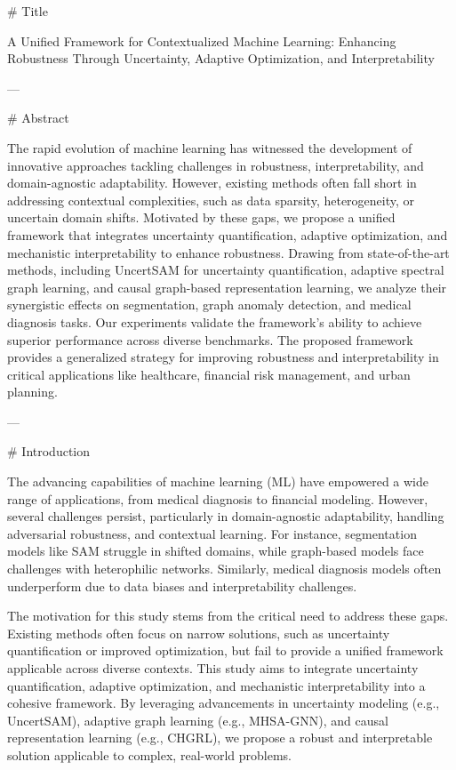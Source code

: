 # Title

A Unified Framework for Contextualized Machine Learning: Enhancing Robustness Through Uncertainty, Adaptive Optimization, and Interpretability

---

# Abstract

The rapid evolution of machine learning has witnessed the development of innovative approaches tackling challenges in robustness, interpretability, and domain-agnostic adaptability. However, existing methods often fall short in addressing contextual complexities, such as data sparsity, heterogeneity, or uncertain domain shifts. Motivated by these gaps, we propose a unified framework that integrates uncertainty quantification, adaptive optimization, and mechanistic interpretability to enhance robustness. Drawing from state-of-the-art methods, including UncertSAM for uncertainty quantification, adaptive spectral graph learning, and causal graph-based representation learning, we analyze their synergistic effects on segmentation, graph anomaly detection, and medical diagnosis tasks. Our experiments validate the framework's ability to achieve superior performance across diverse benchmarks. The proposed framework provides a generalized strategy for improving robustness and interpretability in critical applications like healthcare, financial risk management, and urban planning.

---

# Introduction

The advancing capabilities of machine learning (ML) have empowered a wide range of applications, from medical diagnosis to financial modeling. However, several challenges persist, particularly in domain-agnostic adaptability, handling adversarial robustness, and contextual learning. For instance, segmentation models like SAM struggle in shifted domains, while graph-based models face challenges with heterophilic networks. Similarly, medical diagnosis models often underperform due to data biases and interpretability challenges.

The motivation for this study stems from the critical need to address these gaps. Existing methods often focus on narrow solutions, such as uncertainty quantification or improved optimization, but fail to provide a unified framework applicable across diverse contexts. This study aims to integrate uncertainty quantification, adaptive optimization, and mechanistic interpretability into a cohesive framework. By leveraging advancements in uncertainty modeling (e.g., UncertSAM), adaptive graph learning (e.g., MHSA-GNN), and causal representation learning (e.g., CHGRL), we propose a robust and interpretable solution applicable to complex, real-world problems.

